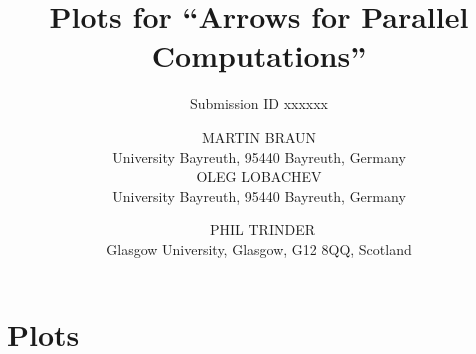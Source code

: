 \documentclass{jfp1}
\title{Plots for \enquote{Arrows for Parallel Computations}}
\author{Submission ID xxxxxx}
\author[M. Braun, O. Lobachev and P. Trinder]%
        {MARTIN BRAUN\\
         University Bayreuth, 95440 Bayreuth, Germany\\
		 OLEG LOBACHEV\\
		 University Bayreuth, 95440 Bayreuth, Germany\\
		 \and\ PHIL TRINDER\\
		 Glasgow University, Glasgow, G12 8QQ, Scotland}
\begin{document}
\label{firstpage}

\def\SymbReg{\textsuperscript{\textregistered}}

\maketitle

\tableofcontents

\section{Plots}

\newlength{\plotwidthDist}
\setlength{\plotwidthDist}{0.6\textwidth}
\newlength{\plotwidthSMP}
\setlength{\plotwidthSMP}{0.39\textwidth}

\newcommand{\meanOverheadPlot}[5]{
\begin{tikzpicture}
\begin{axis}[title={#1},
title style={align=center},
scale only axis, width=\plotwidthDist,
xlabel=Threads,
ytick distance=#2 / 4,
xtick distance=#3,
minor tick num=9,
ylabel=Overhead (\%),
ylabel near ticks,
grid=both,
legend entries={Mean Overhead},
legend style={at={(0.99,0.99)},anchor=north east},
max space between ticks=50pt,
grid style={line width=.1pt, draw=gray!10},
major grid style={line width=.2pt,draw=gray!50},
ymin=-#2,
ymax=#2,
xmin=-1,
xmax=#4]
\addplot+[mark=*,very thick,error bars/.cd,
    y dir=both,y explicit] table [x="nCores", y="overhead", y error="stdDevForOverhead", col sep=comma, mark=dots,
smooth]{#5};
\end{axis}
\end{tikzpicture}
}

\newcommand{\speedupplot}[7]{
\begin{tikzpicture}
\begin{axis}[title={#1},
title style={align=center},
scale only axis, width=#7,
xlabel=Threads,
xtick distance=#4,
ytick distance=#4,
ylabel=Speedup,
ylabel near ticks,
grid=major,
legend entries={linear, #2},
legend style={at={(0.01,0.99)},anchor=north west},
max space between ticks=50pt,
grid style={line width=.1pt, draw=gray!10},
major grid style={line width=.2pt,draw=gray!50},
ymin=-1,
xmin=-1,
ymax=#6,
xmax=#6]
\addplot [domain=0:#3, no markers,dotted,thick]{x};
#5
\end{axis}
\end{tikzpicture}
}

\newcommand{\rmtest}{Rabin--Miller test\xspace}
\newcommand{\sudokutest}{Sudoku\xspace}
\newcommand{\jacobitest}{Jacobi sum test\xspace}
\newcommand{\torustest}{Gentleman\xspace}
\end{document}
